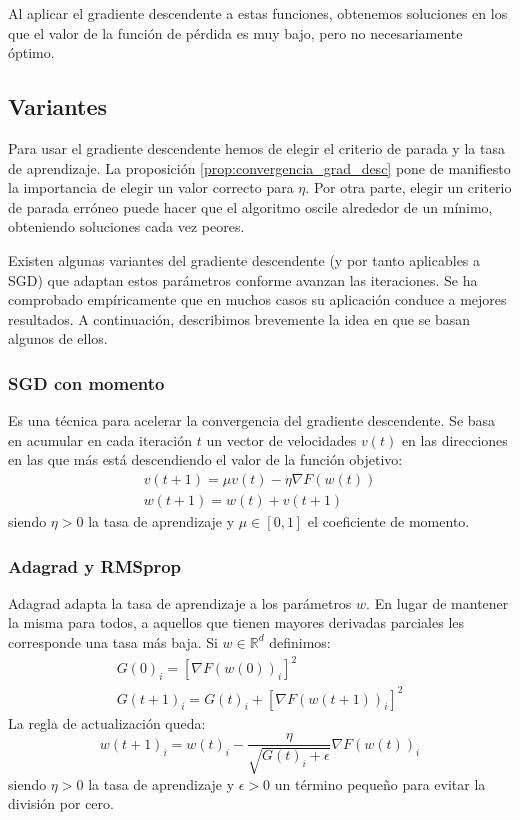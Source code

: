 Al aplicar el gradiente descendente a estas funciones, obtenemos soluciones en los que el valor de la función de pérdida es muy bajo, pero no necesariamente óptimo.

\subsection{Variantes}
Para usar el gradiente descendente hemos de elegir el criterio de parada y la tasa de aprendizaje. La proposición \ref{prop:convergencia_grad_desc} pone de manifiesto la importancia de elegir un valor correcto para $\eta$. Por otra parte, elegir un criterio de parada erróneo puede hacer que el algoritmo oscile alrededor de un mínimo, obteniendo soluciones cada vez peores.

Existen algunas variantes del gradiente descendente (y por tanto aplicables a SGD) que adaptan estos parámetros conforme avanzan las iteraciones. Se ha comprobado empíricamente que en muchos casos su aplicación conduce a mejores resultados. A continuación, describimos brevemente la idea en que se basan algunos de ellos. 

\subsubsection{SGD con momento}
Es una técnica para acelerar la convergencia del gradiente descendente. Se basa en acumular en cada iteración $t$ un vector de velocidades $v(t)$ en las direcciones en las que más está descendiendo el valor de la función objetivo:
\begin{gather*}
	v(t+1) = \mu v(t) - \eta \nabla F(w(t))\\
	w(t+1) = w(t) + v(t+1)
\end{gather*}
siendo $\eta > 0$ la tasa de aprendizaje y $\mu \in [0,1]$ el coeficiente de momento. 

\subsubsection{Adagrad y RMSprop}
Adagrad adapta la tasa de aprendizaje a los parámetros $w$. En lugar de mantener la misma para todos, a aquellos que tienen mayores derivadas parciales les corresponde una tasa más baja. Si $w \in \mathbb{R}^d$ definimos:
\begin{gather*}
	G(0)_{i} = [ \nabla F(w(0))_{i} ]^2\\
	G(t+1)_{i} = G(t)_{i} + [ \nabla F(w(t+1))_{i} ]^2
\end{gather*}
La regla de actualización queda:
$$ w(t+1)_{i} = w(t)_{i} - \dfrac{\eta}{\sqrt{G(t)_{i} + \epsilon}} \nabla F(w(t))_{i} $$
siendo $\eta > 0$ la tasa de aprendizaje y $\epsilon > 0$ un término pequeño para evitar la división por cero.

